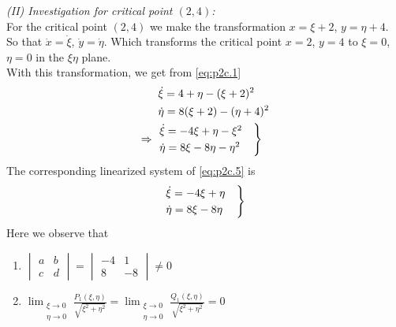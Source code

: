 \documentclass[../main-sheet.tex]{subfiles}
\begin{document}
\begin{soln}[c]
    
    \emph{(II) Investigation for critical point \((2,4)\):}\\
    For the critical point \((2,4)\) we make the transformation \(x=\xi+2\), \(y=\eta+4\). So that \(\dot{x}=\dot{\xi}\), \(\dot{y}=\dot{\eta}\). Which transforms the critical point \(x=2\), \(y=4\) to \(\xi=0\), \(\eta=0\) in the \(\xi\eta\) plane.\\
    With this transformation, we get from \eqref{eq:p2c.1}
    \begin{align}
        &\dot{\xi}=4+\eta-(\xi+2)^2\notag\\
        &\dot{\eta}=8(\xi+2)-(\eta+4)^2\notag\\
        \Rightarrow\;\;&\begin{aligned}
            \begin{rcases}
                \dot{\xi}=-4\xi+\eta-\xi^2\quad\\
                \dot{\eta}=8\xi-8\eta-\eta^2
            \end{rcases}
        \end{aligned}\label{eq:p2c.5}
    \end{align}
    The corresponding linearized system of \eqref{eq:p2c.5} is 
    \begin{equation}
        \begin{rcases}
            \dot{\xi}=-4\xi+\eta\quad\\
            \dot{\eta}=8\xi-8\eta\quad
        \end{rcases}
        \label{eq:p2c.6}
    \end{equation}
    Here we observe that
    \begin{enumerate}[label=(\roman*)]
        \item \(\begin{vmatrix}
            a&b\\
            c&d
        \end{vmatrix}=\begin{vmatrix}
            -4&1\\
            8&-8
        \end{vmatrix}\neq 0\)
        \item \(\displaystyle\lim_{\substack{\xi\to 0 \\ \eta\to 0}} \frac{P_1(\xi,\eta)}{\sqrt{\xi^2+\eta^2}}=\lim_{\substack{\xi\to 0 \\ \eta\to 0}} \frac{Q_1(\xi,\eta)}{\sqrt{\xi^2+\eta^2}}=0\)\\ 
        

\end{enumerate}
\end{soln}
\end{document}

